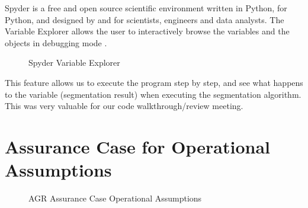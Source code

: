 Spyder is a free and open source scientific environment written in Python, for Python, and designed by and for scientists, engineers and data analysts. The Variable Explorer allows the user to interactively browse the variables and the objects in debugging mode \cite{raybaut2009spyder}.
\begin{figure}[H]
    \centering
    \caption[Spyder Variable Explorer]{Spyder Variable Explorer \cite{raybaut2009spyder}}
    \label{fig_spyder_ve}
\end{figure}

This feature allows us to execute the program step by step, and see what happens to the variable (segmentation result) when executing the segmentation algorithm. This was very valuable for our code walkthrough/review meeting.

\section{Assurance Case for Operational Assumptions}

\begin{figure}[H]
    \centering
    \caption[AGR Assurance Case Operational Assumptions]{AGR Assurance Case Operational Assumptions}
    \label{fig_agr_ac_gba}
\end{figure}

